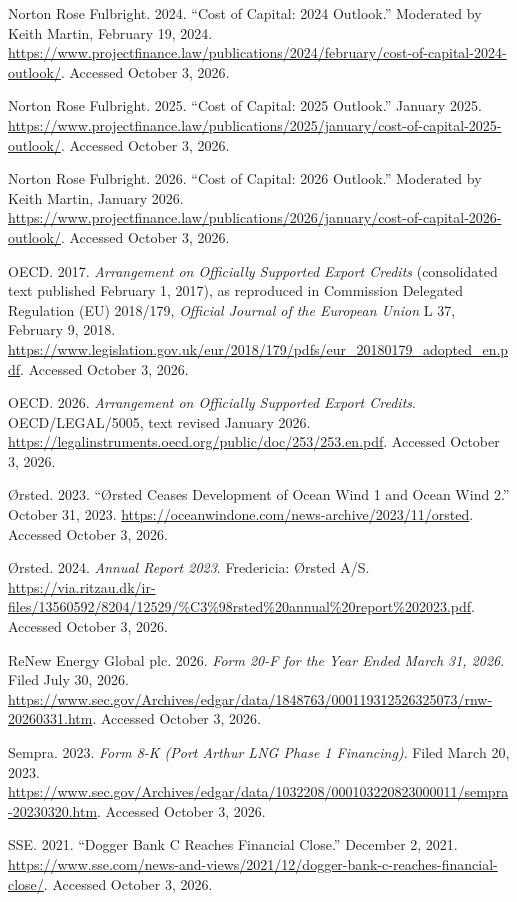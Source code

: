 \begin{sloppypar}
\begin{sources}
\item Norton Rose Fulbright. 2024. ``Cost of Capital: 2024 Outlook.'' Moderated by Keith Martin, February 19, 2024. \url{https://www.projectfinance.law/publications/2024/february/cost-of-capital-2024-outlook/}. Accessed October 3, 2026.
\item Norton Rose Fulbright. 2025. ``Cost of Capital: 2025 Outlook.'' January 2025. \url{https://www.projectfinance.law/publications/2025/january/cost-of-capital-2025-outlook/}. Accessed October 3, 2026.
\item Norton Rose Fulbright. 2026. ``Cost of Capital: 2026 Outlook.'' Moderated by Keith Martin, January 2026. \url{https://www.projectfinance.law/publications/2026/january/cost-of-capital-2026-outlook/}. Accessed October 3, 2026.
\item OECD. 2017. \textit{Arrangement on Officially Supported Export Credits} (consolidated text published February 1, 2017), as reproduced in Commission Delegated Regulation (EU) 2018/179, \textit{Official Journal of the European Union} L 37, February 9, 2018. \url{https://www.legislation.gov.uk/eur/2018/179/pdfs/eur_20180179_adopted_en.pdf}. Accessed October 3, 2026.
\item OECD. 2026. \textit{Arrangement on Officially Supported Export Credits}. OECD/LEGAL/5005, text revised January 2026. \url{https://legalinstruments.oecd.org/public/doc/253/253.en.pdf}. Accessed October 3, 2026.
\item Ørsted. 2023. ``Ørsted Ceases Development of Ocean Wind 1 and Ocean Wind 2.'' October 31, 2023. \url{https://oceanwindone.com/news-archive/2023/11/orsted}. Accessed October 3, 2026.
\item Ørsted. 2024. \textit{Annual Report 2023}. Fredericia: Ørsted A/S. \url{https://via.ritzau.dk/ir-files/13560592/8204/12529/%C3%98rsted%20annual%20report%202023.pdf}. Accessed October 3, 2026.
\item ReNew Energy Global plc. 2026. \textit{Form 20-F for the Year Ended March 31, 2026}. Filed July 30, 2026. \url{https://www.sec.gov/Archives/edgar/data/1848763/000119312526325073/rnw-20260331.htm}. Accessed October 3, 2026.
\item Sempra. 2023. \textit{Form 8-K (Port Arthur LNG Phase 1 Financing)}. Filed March 20, 2023. \url{https://www.sec.gov/Archives/edgar/data/1032208/000103220823000011/sempra-20230320.htm}. Accessed October 3, 2026.
\item SSE. 2021. ``Dogger Bank C Reaches Financial Close.'' December 2, 2021. \url{https://www.sse.com/news-and-views/2021/12/dogger-bank-c-reaches-financial-close/}. Accessed October 3, 2026.

\end{sources}
\end{sloppypar}
